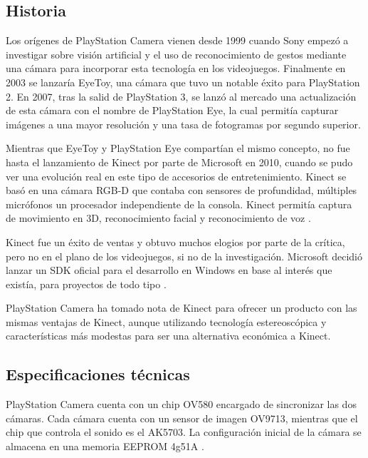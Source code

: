 \subsection{Historia}
Los orígenes de PlayStation Camera vienen desde 1999 cuando Sony empezó a
investigar sobre visión artificial y el uso de reconocimiento de gestos mediante
una cámara para incorporar esta tecnología en los videojuegos. Finalmente en
2003 se lanzaría EyeToy, una cámara que tuvo un notable éxito para PlayStation
2. En 2007, tras la salid de PlayStation 3, se lanzó al mercado una
actualización de esta cámara con el nombre de PlayStation Eye, la cual permitía
capturar imágenes a una mayor resolución y una tasa de fotogramas por segundo
superior.

Mientras que EyeToy y PlayStation Eye compartían el mismo concepto, no fue hasta
el lanzamiento de Kinect por parte de Microsoft en 2010, cuando se pudo ver una
evolución real en este tipo de accesorios de entretenimiento. Kinect se basó en
una cámara RGB-D que contaba con sensores de profundidad, múltiples micrófonos
un procesador independiente de la consola. Kinect permitía captura de movimiento
en 3D, reconocimiento facial y reconocimiento de voz \cite{Kinect}.

Kinect fue un éxito de ventas y obtuvo muchos elogios por parte de la crítica,
pero no en el plano de los videojuegos, si no de la investigación. Microsoft
decidió lanzar un SDK oficial para el desarrollo en Windows en base al interés
que existía, para proyectos de todo tipo \cite{KinectSDK}.

PlayStation Camera ha tomado nota de Kinect para ofrecer un producto con las
mismas ventajas de Kinect, aunque utilizando tecnología estereoscópica y
características más modestas para ser una alternativa económica a Kinect.

\subsection{Especificaciones técnicas}
PlayStation Camera cuenta con un chip OV580 encargado de sincronizar las dos
cámaras. Cada cámara cuenta con un sensor de imagen OV9713, mientras que el chip
que controla el sonido es el AK5703. La configuración inicial de la cámara se
almacena en una memoria EEPROM 4g51A \cite{PSCameraSpecs}.


